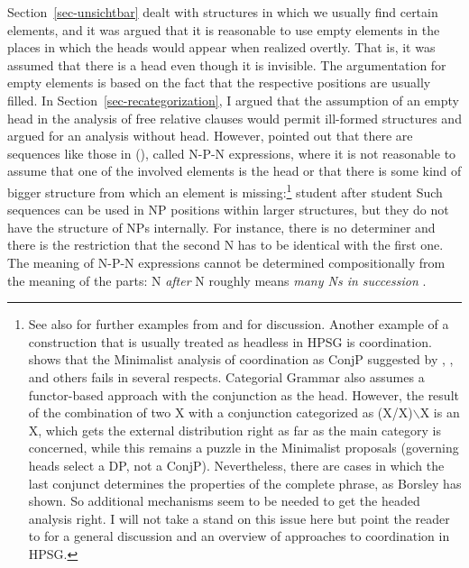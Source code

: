 \documentclass[output=paper
  ,nobabel
  ,draftmode
  ,uniformtopskip %
  ,colorlinks, citecolor=brown
]{langscibook}
\begin{document}
Section~\ref{sec-unsichtbar} dealt with structures in which we usually find certain elements, and it
was argued that it is reasonable to use empty elements in the places in which the heads would appear
when realized overtly. That is, it was assumed that there is a head even though it is invisible. The
argumentation for empty elements is based on the fact that the respective positions are usually
filled. In Section~\ref{sec-recategorization}, I argued that the assumption of an empty head in the
analysis of free relative clauses would permit ill-formed structures and argued for an analysis
without head. However, \citet{Jackendoff2008a} pointed out that there are sequences like those in
(), called N-P-N expressions, where it is not reasonable to assume that one of the involved
elements is the head or that there is some kind of bigger structure from which an element is missing:\footnote{
  See also  for further examples from  and 
  for discussion. Another example of a construction that is usually treated as headless in HPSG is
  coordination. \citet{Borsley2005a} shows that the Minimalist analysis of coordination as ConjP
  suggested by \citet[Chapter~6]{Kayne:94}, \citet[Chapter~3]{Johannessen98a-u}, and others fails in several
  respects. Categorial Grammar also assumes a functor-based approach with the conjunction as the
  head. However, the result of the combination of two X with a conjunction categorized as
  (X/X)$\backslash$X is an X, which gets the external distribution right as far as the main category
  is concerned, while this remains a puzzle in the Minimalist proposals (governing heads select a DP,
  not a ConjP). Nevertheless, there are
  cases in which the last conjunct determines the properties of the complete phrase, as Borsley has
  shown. So additional mechanisms seem to be needed to get the headed analysis right. I will not
  take a stand on this issue here but point the reader to  for a general 
  discussion and an overview of approaches to coordination in HPSG.
}
\ea
student after student
\z
Such sequences can be used in NP positions within larger structures, but they do not have the
structure of NPs internally. For instance, there is no determiner and there is the restriction that
the second N has to be identical with the first one. The meaning of N-P-N expressions cannot be
determined compositionally from the meaning of the parts: N \emph{after} N roughly means
\emph{many Ns in succession} \citep[]{Jackendoff2008a}.
\end{document}

